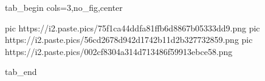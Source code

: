  
 
 
 
 


\ifcmt
  tab_begin cols=3,no_fig,center

     pic https://i2.paste.pics/75f1ca44ddfa81ffb6d8867b05333dd9.png
		 pic https://i2.paste.pics/56cd2678d942d1742b11d2b327732859.png
		 pic https://i2.paste.pics/002cf8304a314d713486f59913ebce58.png

  tab_end
\fi
